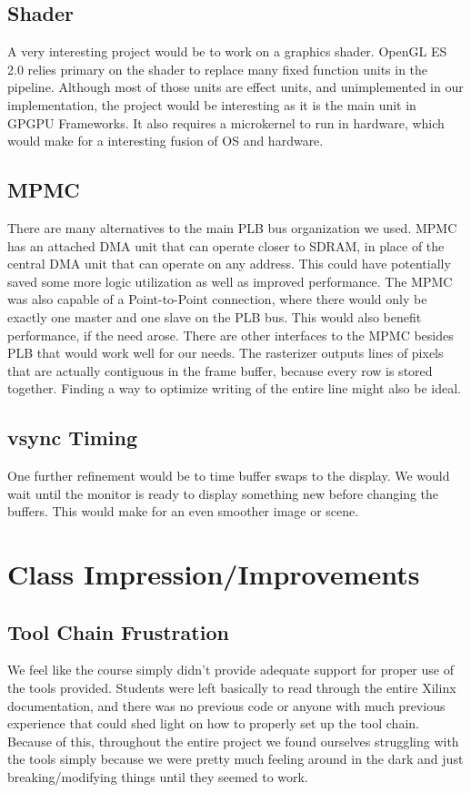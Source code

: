 \documentclass[letterpaper,10pt]{article}
\begin{document}
\subsection{Shader}
A very interesting project would be to work on a graphics shader.  OpenGL ES 2.0 relies primary on the shader to replace many fixed function units in the pipeline.  Although most of those units are effect units, and unimplemented in our implementation, the project would be interesting as it is the main unit in GPGPU Frameworks.  It also requires a microkernel to run in hardware, which would make for a interesting fusion of OS and hardware.

\subsection{MPMC}
There are many alternatives to the main PLB bus organization we used.  MPMC has an attached DMA unit that can operate closer to SDRAM, in place of the central DMA unit that can operate on any address.  This could have potentially saved some more logic utilization as well as improved performance.  The MPMC was also capable of a Point-to-Point connection, where there would only be exactly one master and one slave on the PLB bus.  This would also benefit performance, if the need arose.  There are other interfaces to the MPMC besides PLB that would work well for our needs.  The rasterizer outputs lines of pixels that are actually contiguous in the frame buffer, because every row is stored together.  Finding a way to optimize writing of the entire line might also be ideal.

\subsection{vsync Timing}
One further refinement would be to time buffer swaps to the display.  We would wait until the monitor is ready to display something new before changing the buffers.  This would make for an even smoother image or scene.

\section{Class Impression/Improvements}

\subsection{Tool Chain Frustration}

We feel like the course simply didn't provide adequate support for proper use of the tools provided. Students were left basically to read through the entire Xilinx documentation, and there was no previous code or anyone with much previous experience that could shed light on how to properly set up the tool chain. Because of this, throughout the entire project we found ourselves struggling with the tools simply because we were pretty much feeling around in the dark and just breaking/modifying things until they seemed to work.
\end{document}
